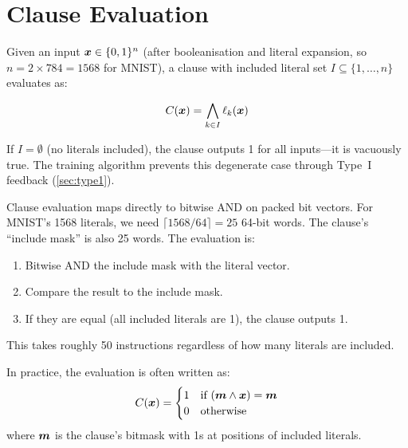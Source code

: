 \section{Clause Evaluation}
\label{sec:clause-eval}

Given an input $\bm{x} \in \{0, 1\}^n$ (after booleanisation and
literal expansion, so $n = 2 \times 784 = 1568$ for MNIST), a clause
with included literal set $I \subseteq \{1, \ldots, n\}$ evaluates as:

\begin{equation}
  C(\bm{x}) = \bigwedge_{k \in I} \ell_k(\bm{x})
  \label{eq:clause-eval}
\end{equation}

If $I = \emptyset$ (no literals included), the clause outputs 1 for
all inputs---it is vacuously true. The training algorithm prevents
this degenerate case through Type~I feedback (\cref{sec:type1}).

\begin{engineernote}
Clause evaluation maps directly to bitwise AND on packed bit vectors.
For MNIST's 1568 literals, we need $\lceil 1568 / 64 \rceil = 25$
64-bit words. The clause's ``include mask'' is also 25 words. The
evaluation is:
\begin{enumerate}
  \item Bitwise AND the include mask with the literal vector.
  \item Compare the result to the include mask.
  \item If they are equal (all included literals are 1), the clause
    outputs 1.
\end{enumerate}
This takes roughly 50 instructions regardless of how many literals
are included.
\end{engineernote}

In practice, the evaluation is often written as:
\begin{equation}
  C(\bm{x}) = \begin{cases}
    1 & \text{if } (\bm{m} \wedge \bm{x}) = \bm{m} \\
    0 & \text{otherwise}
  \end{cases}
  \label{eq:clause-bitmask}
\end{equation}
where $\bm{m}$ is the clause's bitmask with 1s at positions of
included literals.


